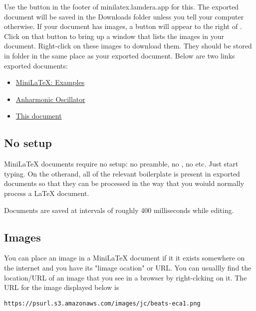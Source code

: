 Use the  button in the footer of minilatex.lamdera.app for this.  The exported document will be saved in the Downloads folder unless you tell your computer otherwise.  If your document has images, a button  will appear to the right of .  Click on that button to bring up a window that lists the images in your document.  Right-click on these images to download them.  They should be stored in folder  in the same place as your exported document.  Below are two links  exported documents:


\begin{itemize}


\item \href{https://noteimages.s3.amazonaws.com/Minilatex__Examples.pdf}{MiniLaTeX: Examples}

\item \href{https://noteimages.s3.amazonaws.com/anharmonic_oscillator.pdf}{Anharmonic Oscillator}

\item \href{https://noteimages.s3.amazonaws.com/TUG_Talk_July_2020.pdf}{This document}

\end{itemize}


\subsection{No setup}

MiniLaTeX documents require no setup: no preamble, no , no  etc.  Just start typing. On the otherand, all of the relevant boilerplate is present in exported documents so that they can be processed in the way that you woiuld normally process a LaTeX document.

Documents are saved at intervals of roughly 400 milliseconds while editing.

\subsection{Images}

You can place an image in a MiniLaTeX document if it it exists somewhere on the internet and you have its "limage ocation" or URL.  You can usuallly find the location/URL of an image that you see in a browser  by right-clcking on it. The URL for the image displayed below is

\begin{verbatim}
https://psurl.s3.amazonaws.com/images/jc/beats-eca1.png
\end{verbatim}

